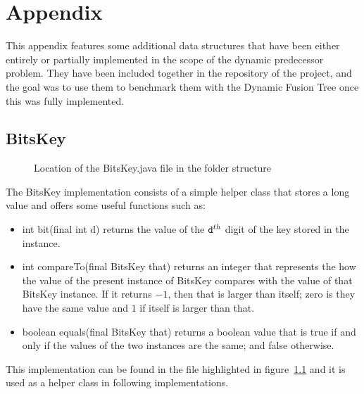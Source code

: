 
\chapter{Appendix} \label{sec:appendix}

This appendix features some additional data structures that have been either entirely or partially implemented in the scope of the dynamic predecessor problem. They have been included together in the repository of the project, and the goal was to use them to benchmark them with the Dynamic Fusion Tree once this was fully implemented.

\section{{\ttfamily BitsKey}}

\begin{figure}[H]
\caption{Location of the {\ttfamily BitsKey.java} file in the folder structure}
\label{fig:BitsKeyTree}
\end{figure}

The {\ttfamily BitsKey} implementation consists of a simple helper class that stores a {\ttfamily long} value and offers some useful functions such as:
\begin{itemize}
    \item
    {\ttfamily int bit(final int d)} returns the value of the $\text{{\ttfamily d}}^{th}$ digit of the key stored in the instance.
    
    \item
    {\ttfamily int compareTo(final BitsKey that)} returns an integer that represents the how the value of the present instance of {\ttfamily BitsKey} compares with the value of {\ttfamily that BitsKey} instance. If it returns $-1$, then {\ttfamily that} is larger than itself; zero is they have the same value and $1$ if itself is larger than {\ttfamily that}.
    
    \item
    {\ttfamily boolean equals(final BitsKey that)} returns a {\ttfamily boolean} value that is {\ttfamily true} if and only if the values of the two instances are the same; and {\ttfamily false} otherwise.
\end{itemize}

This implementation can be found in the file highlighted in figure~\ref{fig:BitsKeyTree} and it is used as a helper class in following implementations.


